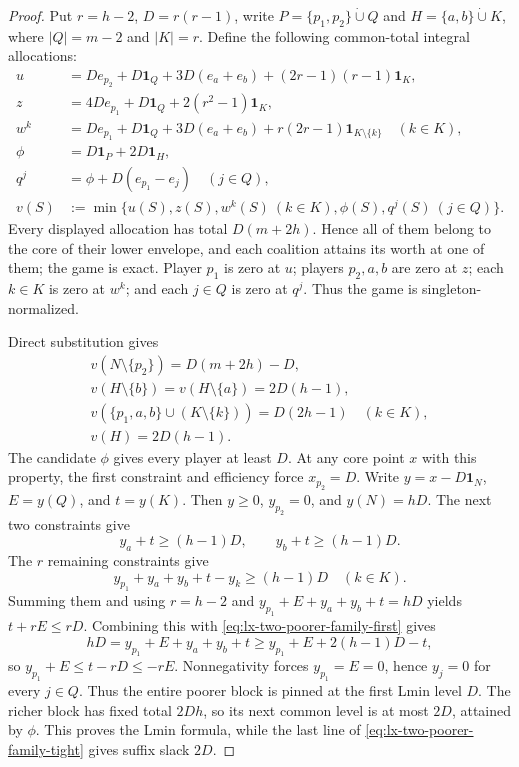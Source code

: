 \begin{proof}
Put $r=h-2$, $D=r(r-1)$, write
$P=\{p_1,p_2\}\mathbin{\dot\cup}Q$ and
$H=\{a,b\}\mathbin{\dot\cup}K$, where $|Q|=m-2$ and $|K|=r$.  Define the
following common-total integral allocations:
\[
\begin{aligned}
u&=D e_{p_2}+D\mathbf1_Q+3D(e_a+e_b)
       +(2r-1)(r-1)\mathbf1_K,\\
z&=4D e_{p_1}+D\mathbf1_Q+2(r^2-1)\mathbf1_K,\\
w^k&=D e_{p_1}+D\mathbf1_Q+3D(e_a+e_b)
       +r(2r-1)\mathbf1_{K\setminus\{k\}}\quad(k\in K),\\
\phi&=D\mathbf1_P+2D\mathbf1_H,\\
q^j&=\phi+D(e_{p_1}-e_j)\quad(j\in Q),\\
v(S)&:=\min\{u(S),z(S),w^k(S)\ (k\in K),
                    \phi(S),q^j(S)\ (j\in Q)\}.
\end{aligned}                                                   \tag{TF}
\label{eq:lx-two-poorer-family}
\]
Every displayed allocation has total $D(m+2h)$.  Hence all of them
belong to the core of their lower envelope, and each coalition attains its
worth at one of them; the game is exact.  Player $p_1$ is zero at $u$;
players $p_2,a,b$ are zero at $z$; each $k\in K$ is zero at $w^k$; and each
$j\in Q$ is zero at $q^j$.  Thus the game is singleton-normalized.

Direct substitution gives
\[
\begin{gathered}
v(N\setminus\{p_2\})=D(m+2h)-D,\\
v(H\setminus\{b\})=v(H\setminus\{a\})=2D(h-1),\\
v(\{p_1,a,b\}\cup(K\setminus\{k\}))=D(2h-1)\quad(k\in K),\\
v(H)=2D(h-1).                                      \tag{TF-T}
\label{eq:lx-two-poorer-family-tight}
\end{gathered}
\]
The candidate $\phi$ gives every player at least $D$.  At any core point $x$
with this property, the first constraint and efficiency force $x_{p_2}=D$.
Write $y=x-D\mathbf1_N$, $E=y(Q)$, and $t=y(K)$.  Then
$y\geq0$, $y_{p_2}=0$, and $y(N)=hD$.  The next two constraints give
\[
 y_a+t\geq(h-1)D,\qquad y_b+t\geq(h-1)D.           \tag{TF-1}
 \label{eq:lx-two-poorer-family-first}
\]
The $r$ remaining constraints give
\[
 y_{p_1}+y_a+y_b+t-y_k\geq(h-1)D\quad(k\in K).
\]
Summing them and using $r=h-2$ and
$y_{p_1}+E+y_a+y_b+t=hD$ yields
$t+rE\leq rD$.  Combining this with
\eqref{eq:lx-two-poorer-family-first} gives
\[
hD=y_{p_1}+E+y_a+y_b+t
 \geq y_{p_1}+E+2(h-1)D-t,
\]
so $y_{p_1}+E\leq t-rD\leq-rE$.  Nonnegativity forces
$y_{p_1}=E=0$, hence $y_j=0$ for every $j\in Q$.  Thus the entire poorer block
is pinned at the first Lmin level $D$.  The richer block has fixed total
$2Dh$, so its next common level is at most $2D$, attained by $\phi$.  This
proves the Lmin formula, while the last line of
\eqref{eq:lx-two-poorer-family-tight} gives suffix slack $2D$.


\end{proof}
